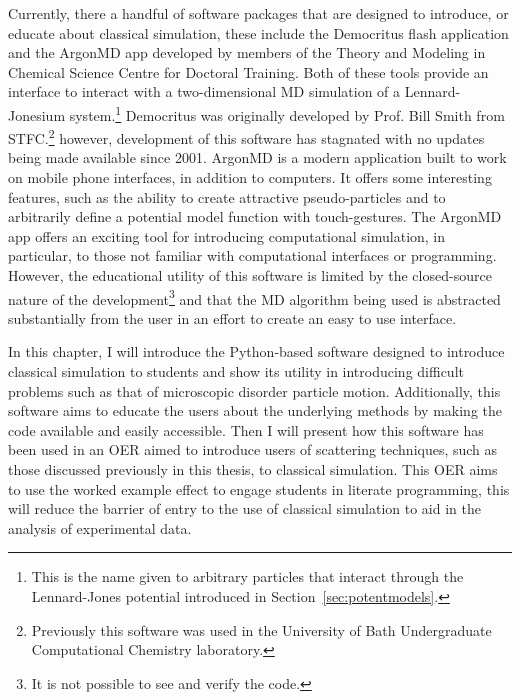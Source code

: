 Currently, there a handful of software packages that are designed to introduce, or educate about classical simulation, these include the Democritus flash application and the ArgonMD app developed by members of the Theory and Modeling in Chemical Science Centre for Doctoral Training.
Both of these tools provide an interface to interact with a two-dimensional MD simulation of a Lennard-Jonesium system.\footnote{This is the name given to arbitrary particles that interact through the Lennard-Jones potential introduced in Section~\ref{sec:potentmodels}.}
Democritus was originally developed by Prof. Bill Smith from STFC.\footnote{Previously this software was used in the University of Bath Undergraduate Computational Chemistry laboratory.} however, development of this software has stagnated with no updates being made available since 2001.
ArgonMD is a modern application built to work on mobile phone interfaces, in addition to computers.
It offers some interesting features, such as the ability to create attractive pseudo-particles and to arbitrarily define a potential model function with touch-gestures.
The ArgonMD app offers an exciting tool for introducing computational simulation, in particular, to those not familiar with computational interfaces or programming.
However, the educational utility of this software is limited by the closed-source nature of the development\footnote{It is not possible to see and verify the code.} and that the MD algorithm being used is abstracted substantially from the user in an effort to create an easy to use interface.

In this chapter, I will introduce the Python-based software designed to introduce classical simulation to students and show its utility in introducing difficult problems such as that of microscopic disorder particle motion.
Additionally, this software aims to educate the users about the underlying methods by making the code available and easily accessible.
Then I will present how this software has been used in an OER aimed to introduce users of scattering techniques, such as those discussed previously in this thesis, to classical simulation.
This OER aims to use the worked example effect to engage students in literate programming, this will reduce the barrier of entry to the use of classical simulation to aid in the analysis of experimental data.
